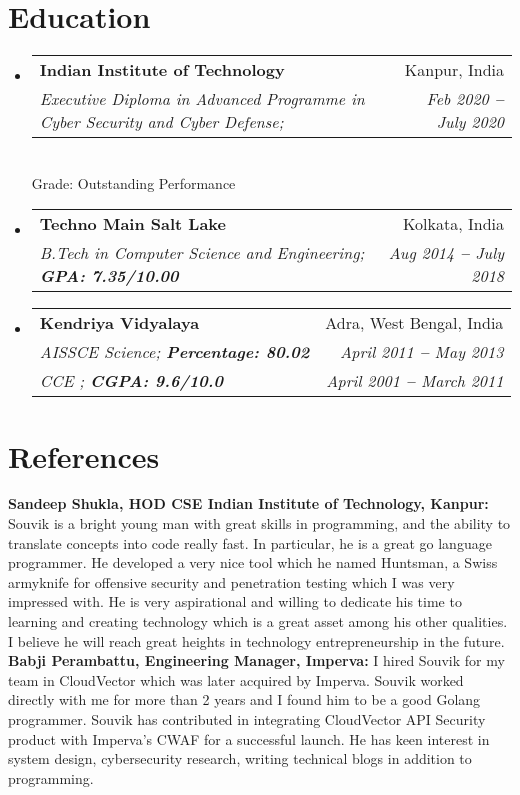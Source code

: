 \documentclass[letterpaper,11pt]{article}
\makeatletter
\newcommand{\resumeSubheading}[4]{
  \vspace{-2pt}\item
    \begin{tabular*}{0.97\textwidth}[t]{l@{\extracolsep{\fill}}r}
      \textbf{#1} & #2 \\
      \textit{\small#3} & \textit{\small #4} \\
    \end{tabular*}\vspace{-7pt}
}
\newcommand{\resumeEducationHeading}[6]{
  \vspace{-2pt}\item
    \begin{tabular*}{0.97\textwidth}[t]{l@{\extracolsep{\fill}}r}
      \textbf{#1} & #2 \\
      \textit{\small#3} & \textit{\small #4} \\
      \textit{\small#5} & \textit{\small #6} \\
    \end{tabular*}\vspace{-5pt}
}
\newcommand{\resumeSubHeadingListStart}{\begin{itemize}[leftmargin=0.15in, label={}]}
\newcommand{\resumeSubHeadingListEnd}{\end{itemize}}
\makeatother
\begin{document}

\section{Education}
  \vspace{3pt}
  \resumeSubHeadingListStart
    
    \resumeSubheading
      {Indian Institute of Technology
      }{Kanpur, India} 
      {Executive Diploma in Advanced Programme in Cyber Security and Cyber Defense; }{Feb 2020 \textbf{--} July 2020} \\ \vspace{4pt}
      {Grade: Outstanding Performance}
    \resumeSubheading
      {Techno Main Salt Lake
      }{Kolkata, India}
      {B.Tech in Computer Science and Engineering;   \textbf{GPA: 7.35/10.00}}{Aug 2014 \textbf{--} July 2018}
    
    \resumeEducationHeading
      {Kendriya Vidyalaya 
      }{Adra, West Bengal, India}
      {AISSCE Science;   \textbf{Percentage: 80.02}}{April 2011 \textbf{--} May 2013}
      {CCE ;   \textbf{CGPA: 9.6/10.0}}{April 2001 \textbf{--} March 2011}
    
  \resumeSubHeadingListEnd


\section{References}
  \vspace{2pt}
  \resumeSubHeadingListStart
    \small{\item{
        \textbf{Sandeep Shukla, HOD CSE Indian Institute of Technology, Kanpur:}{ Souvik is a bright young man with great skills in programming, and the ability to translate concepts into code really fast. In particular, he is a great go language programmer. He developed a very nice tool which he named Huntsman, a Swiss armyknife for offensive security and penetration testing which I was very impressed with. He is very aspirational and willing to dedicate his time to learning and creating technology which is a great asset among his other qualities. I believe he will reach great heights in technology entrepreneurship in the future.} \\ \vspace{3pt}
       \textbf{Babji Perambattu, Engineering Manager, Imperva: }{I hired Souvik for my team in CloudVector which was later acquired by Imperva. Souvik worked directly with me for more than 2 years and I found him to be a good Golang programmer. Souvik has contributed in integrating CloudVector API Security product with Imperva's CWAF for a successful launch. He has keen interest in system design, cybersecurity research, writing technical blogs in addition to programming.} 
    }}
  \resumeSubHeadingListEnd
\end{document}
